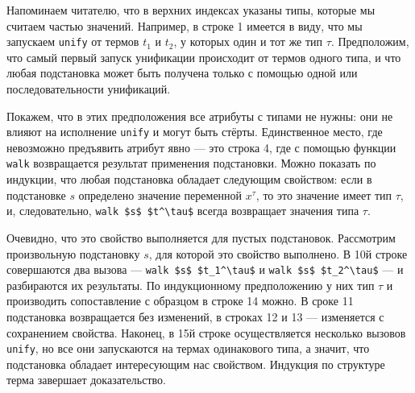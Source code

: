 \noindent Напоминаем читателю, что в верхних индексах указаны типы, которые мы считаем частью значений.
Например, в строке 1 имеется в виду, что мы запускаем \lstinline|unify|
от термов $t_1$ и $t_2$, у которых один и тот же тип $\tau$. Предположим, что самый первый запуск унификации происходит от термов одного типа, и что любая подстановка может быть получена только с помощью одной или последовательности унификаций.


Покажем, что в этих предположения все атрибуты с типами не нужны: они не влияют на исполнение  \lstinline|unify| и могут быть стёрты.
Единственное место, где невозможно предъявить атрибут явно --- это строка 4, где с помощью функции  \lstinline|walk| возвращается результат применения подстановки.
Можно показать по индукции, что любая подстановка обладает следующим свойством: если в  подстановке $s$ определено значение переменной $x^\tau$, то это значение имеет тип $\tau$, и, следовательно,  \lstinline|walk $s$ $t^\tau$| всегда возвращает значения типа  $\tau$.


Очевидно, что это свойство  выполняется для пустых подстановок.
Рассмотрим произвольную подстановку $s$, для которой это свойство выполнено. В 10й строке совершаются два вызова ---
\lstinline|walk $s$ $t_1^\tau$| и \lstinline|walk $s$ $t_2^\tau$| --- и разбираются их результаты.
По индукционному предположению у них тип $\tau$ и производить сопоставление с образцом в строке 14 можно.
В сроке 11 подстановка возвращается без изменений, в строках 12 и 13 --- изменяется с сохранением свойства.
Наконец, в 15й строке осуществляется несколько вызовов \lstinline|unify|, но все они запускаются на термах одинакового типа, а значит, что подстановка обладает интересующим нас свойством. Индукция по структуре терма завершает доказательство.

